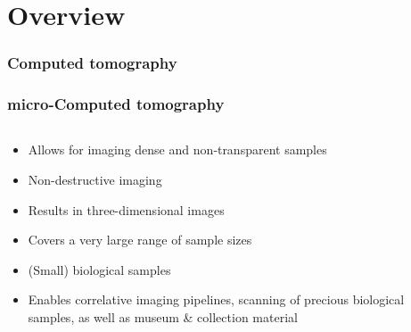 \section{Overview}
\begin{frame}
  \frametitle<1>{Computed tomography}
  \frametitle<2->{micro-Computed tomography}
  \begin{columns}%
    \begin{column}{0.62\textwidth}%
      \begin{itemize}%
        \item<1-|handout:1-> Allows for imaging dense and non‐transparent samples
        \item<1-|handout:1-> Non-destructive imaging
        \item<1-|handout:1-> Results in three-dimensional images 
        \item<1-|handout:1-> Covers a very large range of sample sizes
        \item<2-|handout:2> (Small) biological samples%
        \item<2-|handout:2> Enables correlative imaging pipelines, scanning of precious biological samples, as well as museum \& collection material
      \end{itemize}%
    \end{column}%
    \begin{column}{0.38\textwidth}%
      \centering%
\end{column}
\end{columns}
\end{frame}
